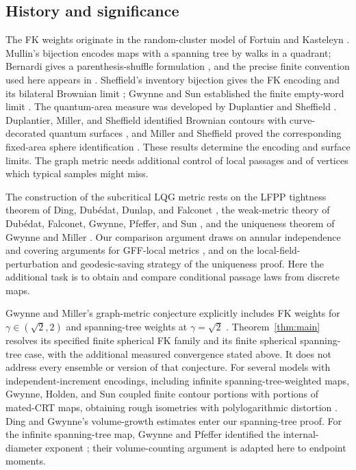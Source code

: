 \subsection{History and significance}

The FK weights originate in the random-cluster model of Fortuin and
Kasteleyn \cite{FortuinKasteleyn1972}. Mullin's bijection
\cite{Mullin1967} encodes maps with a spanning tree by walks in a
quadrant; Bernardi gives a parenthesis-shuffle formulation
\cite{Bernardi2007}, and the precise finite convention used here appears
in \cite[Section~2.3, Theorem~1]{DHBijection}.
Sheffield's inventory bijection gives the FK encoding and its bilateral
Brownian limit \cite{SheffieldInventory}; Gwynne and Sun established
the finite empty-word limit \cite{GwynneSunFinite}.
The quantum-area measure was developed by Duplantier and Sheffield
\cite{DuplantierSheffieldKPZ2011}. Duplantier, Miller, and Sheffield
identified Brownian contours with
curve-decorated quantum surfaces \cite{DMS}, and Miller and Sheffield
proved the corresponding fixed-area sphere identification
\cite{MillerSheffieldSphere}. These results determine the encoding and
surface limits. The graph metric needs additional control of local
passages and of vertices which typical samples might miss.

The construction of the subcritical LQG metric rests on the LFPP
tightness theorem of Ding, Dub\'edat, Dunlap, and Falconet
\cite{DDDFLFPPTightness}, the weak-metric theory of Dub\'edat, Falconet,
Gwynne, Pfeffer, and Sun \cite{DFGPSWeakMetric}, and the uniqueness
theorem of Gwynne and Miller \cite{GwynneMillerMetric}. Our comparison
argument draws on annular independence and covering arguments for
GFF-local metrics \cite[Lemma~3.1 and Section~4]{GwynneMillerLocalMetrics},
and on the local-field-perturbation and geodesic-saving strategy of the
uniqueness proof. Here the additional task is to obtain and compare
conditional passage laws from discrete maps.

Gwynne and Miller's graph-metric conjecture explicitly includes FK
weights for \(\gamma\in(\sqrt2,2)\) and spanning-tree weights at
\(\gamma=\sqrt2\) \cite[Conjecture~1.7]{GwynneMillerMetric}.
Theorem~\ref{thm:main} resolves its specified finite spherical FK family
and its finite spherical spanning-tree case, with the additional
measured convergence stated above. It does not address every ensemble
or version of that conjecture. For several models with independent-increment
encodings, including infinite spanning-tree-weighted maps, Gwynne,
Holden, and Sun coupled finite contour portions with portions of
mated-CRT maps, obtaining rough isometries with polylogarithmic distortion
\cite[Theorem~1.5]{GwynneHoldenSunGraphDistances}.
Ding and Gwynne's volume-growth estimates
\cite[Theorem~1.6, model~2]{DingGwynneDimension} enter our spanning-tree
proof. For the infinite spanning-tree map, Gwynne and Pfeffer identified
the internal-diameter exponent \cite[Theorem~3.1]{GwynnePfefferDLA};
their volume-counting argument \cite[Lemma~3.2]{GwynnePfefferDLA} is
adapted here to endpoint moments.

